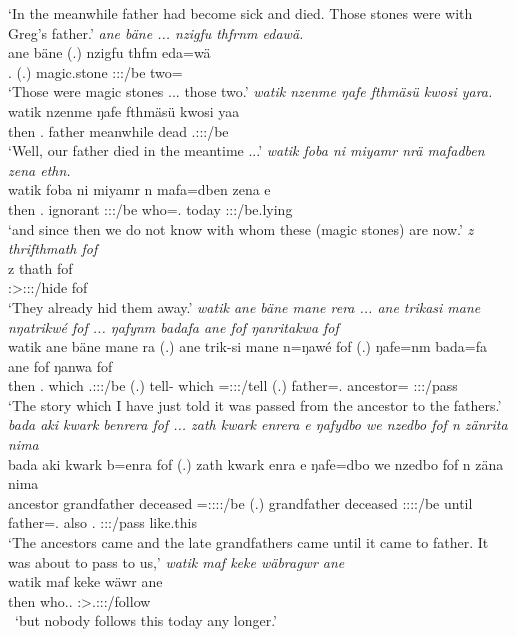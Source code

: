 \begin{exe}
	\trans `In the meanwhile father had become sick and died. Those stones were with Greg's father.'
	\emph{ane bäne ... nzigfu thfrnm edawä.}\\
	\gll ane bäne (.) nzigfu thfm eda=wä\\ 
	{\Dem} \Recog.{\Abs} (.) magic.stone \Stdu:\Sbj:\Pst:\Dur/be two={\Emph}\\
	\trans `Those were magic stones ... those two.'
	\emph{watik nzenme ŋafe fthmäsü kwosi yara.}\\
	\gll watik nzenme ŋafe fthmäsü kwosi yaa\\ 
	then \Fnsg.{\Poss} father meanwhile dead \Tsg.\Masc:\Sbj:\Pst:\Ipfv/be\\
	\trans `Well, our father died in the meantime ...'
	\emph{watik foba ni miyamr nrä mafadben zena ethn.}\\
	\gll watik foba ni miyamr n mafa=dben zena e\\ 
	then \Dist.{\Abl} {\Fnsg} ignorant \Fpl:\Sbj:\Nonpast:\Ipfv/be who=\Loc.{\Sg} today \Stpl:\Sbj:\Nonpast:\Ipfv/be.lying\\
	\trans `and since then we do not know with whom these (magic stones) are now.'
	\emph{z thrifthmath fof}\\
	\gll z thath fof\\ 
	{\Iam} \Stpl:\Sbj>\Stdu:\Obj:\Pst:\Pfv/hide fof\\
	\trans `They already hid them away.'
	\emph{watik ane bäne mane rera ... ane trikasi mane nŋatrikwé fof ... ŋafynm badafa ane fof ŋanritakwa fof}\\
	\gll watik ane bäne mane ra (.) ane trik-si mane n=ŋawé fof (.) ŋafe=nm bada=fa ane fof ŋanwa fof\\ 
	then {\Dem} \Recog.{\Abs} which \Tsg.\F:\Sbj:\Pst:\Ipfv/be (.) {\Dem} tell-{\Nmlz} which \Immpst=\Fsg:\Sbj:\Nonpast:\Ipfv/tell {\Emph} (.) father=\Dat.{\Nsg} ancestor={\Abl} {\Dem} {\Emph} \Sg:\Sbj:\Pst:\Ipfv/pass {\Emph}\\
	\trans `The story which I have just told it was passed from the ancestor to the fathers.'
	\emph{bada aki kwark benrera fof ... zath kwark enrera e ŋafydbo we nzedbo fof n zänrita nima}\\
	\gll bada aki kwark b=enra fof (.) zath kwark enra e ŋafe=dbo we nzedbo fof n zäna nima\\ 
	ancestor grandfather deceased \Med=\Stpl:\Sbj:\Pst:\Ipfv:\Venit/be {\Emph} (.) grandfather deceased \Stpl:\Sbj:\Pst:\Ipfv:\Venit/be until father=\All.{\Sg} also \Fnsg.{\All} {\Emph} {\Iam} \Sg:\Sbj:\Pst:\Pfv/pass like.this\\
	\trans `The ancestors came and the late grandfathers came until it came to father. It was about to pass to us,'
	\emph{watik maf keke wäbragwr ane}\\
	\gll watik maf keke wäwr ane\\ 
	then who.\Erg.{\Sg} {\Neg} \Stsg:\Sbj>\Tsg.\F:\Obj:\Nonpast:\Ipfv/follow {\Dem}\\\
	\trans `but nobody follows this today any longer.'
\end{exe}%